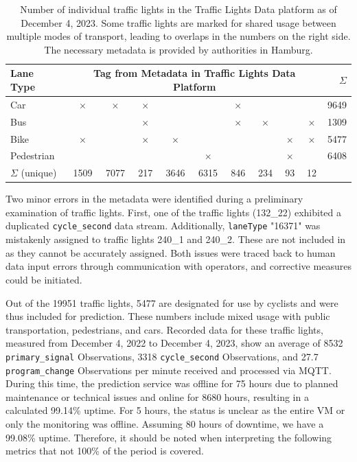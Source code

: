 \begin{table}[t]
    \centering
    \begin{tabular}{@{}lcccccccccr@{}}
        \toprule
        \textbf{Lane Type} & \multicolumn{9}{c}{\textbf{Tag from Metadata in Traffic Lights Data Platform}} & \textbf{$\Sigma$} \\
        \midrule
        Car        & $\times$ & $\times$ & $\times$ &   &   & $\times$ &   &   &   &  9649 \\
        Bus        &   &   & $\times$ &   &   & $\times$ & $\times$ &   & $\times$ &  1309 \\
        Bike     & $\times$ &   & $\times$ & $\times$ &   &   &   & $\times$ & $\times$ &  5477 \\
        Pedestrian &   &   &   &   & $\times$ &   &   & $\times$ &   &  6408 \\
        \midrule
        $\Sigma$ (unique) & 1509 & 7077 & 217 & 3646 & 6315 & 846 & 234 & 93 & 12 & \\
        \bottomrule
    \end{tabular}
    \caption{Number of individual traffic lights in the Traffic Lights Data platform as of December 4, 2023. Some traffic lights are marked for shared usage between multiple modes of transport, leading to overlaps in the numbers on the right side. The necessary metadata is provided by authorities in Hamburg.}
    \label{tab:tld-number-of-things}
\end{table}

Two minor errors in the metadata were identified during a preliminary examination of traffic lights. First, one of the traffic lights (132\_22) exhibited a duplicated \texttt{cycle\_second} data stream. Additionally, \texttt{laneType} "16371" was mistakenly assigned to traffic lights 240\_1 and 240\_2. These are not included in  as they cannot be accurately assigned. Both issues were traced back to human data input errors through communication with operators, and corrective measures could be initiated.

Out of the 19951 traffic lights, 5477 are designated for use by cyclists and were thus included for prediction. These numbers include mixed usage with public transportation, pedestrians, and cars. Recorded data for these traffic lights, measured from December 4, 2022 to December 4, 2023, show an average of 8532 \texttt{primary\_signal} Observations, 3318 \texttt{cycle\_second} Observations, and 27.7 \texttt{program\_change} Observations per minute received and processed via MQTT. During this time, the prediction service was offline for 75 hours due to planned maintenance or technical issues and online for 8680 hours, resulting in a calculated 99.14\% uptime. For 5 hours, the status is unclear as the entire VM or only the monitoring was offline. Assuming 80 hours of downtime, we have a 99.08\% uptime. Therefore, it should be noted when interpreting the following metrics that not 100\% of the period is covered.

